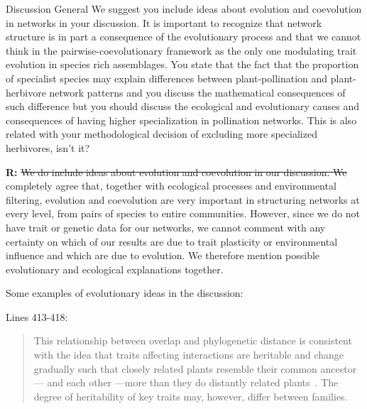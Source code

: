 \documentclass[12pt]{letter}
\newenvironment{refquote}{\bigskip \begin{it}}{\end{it}\smallskip}
\providecommand{\DIFadd}[1]{{\protect\color{blue}\uwave{#1}}} %
\providecommand{\DIFdel}[1]{{\protect\color{red}\sout{#1}}}                      %
\providecommand{\DIFaddbegin}{} %
\providecommand{\DIFaddend}{} %
\providecommand{\DIFdelbegin}{} %
\providecommand{\DIFdelend}{} %
\newcommand{\DIFscaledelfig}{0.5}
\newlength{\DIFdelgraphicswidth} %
\newlength{\DIFdelgraphicsheight} %
\newcommand{\DIFaddincludegraphics}[2][]{{\color{blue}\fbox{\DIFOincludegraphics[#1]{#2}}}} %
\newcommand{\DIFdelincludegraphics}[2][]{%
\sbox{\DIFdelgraphicsbox}{\DIFOincludegraphics[#1]{#2}}%
\settoboxwidth{\DIFdelgraphicswidth}{\DIFdelgraphicsbox} %
\settoboxtotalheight{\DIFdelgraphicsheight}{\DIFdelgraphicsbox} %
\scalebox{\DIFscaledelfig}{%
\parbox[b]{\DIFdelgraphicswidth}{\usebox{\DIFdelgraphicsbox}\\[-\baselineskip] \rule{\DIFdelgraphicswidth}{0em}}\llap{\resizebox{\DIFdelgraphicswidth}{\DIFdelgraphicsheight}{%
\setlength{\unitlength}{\DIFdelgraphicswidth}%
\begin{picture}(1,1)%
\thicklines\linethickness{2pt} %
{\color[rgb]{1,0,0}\put(0,0){\framebox(1,1){}}}%
{\color[rgb]{1,0,0}\put(0,0){\line( 1,1){1}}}%
{\color[rgb]{1,0,0}\put(0,1){\line(1,-1){1}}}%
\end{picture}%
}\hspace*{3pt}}} %
} %
\DeclareRobustCommand{\DIFaddbegin}{\DIFOaddbegin \let\includegraphics\DIFaddincludegraphics} %
\DeclareRobustCommand{\DIFaddend}{\DIFOaddend \let\includegraphics\DIFOincludegraphics} %
\DeclareRobustCommand{\DIFdelbegin}{\DIFOdelbegin \let\includegraphics\DIFdelincludegraphics} %
\DeclareRobustCommand{\DIFdelend}{\DIFOaddend \let\includegraphics\DIFOincludegraphics} %
\begin{document}
		\begin{refquote}
			Discussion
			General
			We suggest you include ideas about evolution and coevolution in networks in your discussion. It is important to recognize that network structure is in part a consequence of the evolutionary process and that we cannot think in the pairwise-coevolutionary framework as the only one modulating trait evolution in species rich assemblages.
			You state that the fact that the proportion of specialist species may explain differences between plant-pollination and plant-herbivore network patterns and you discuss the mathematical consequences of such difference but you should discuss the ecological and evolutionary causes and consequences of having higher specialization in pollination networks. This is also related with your methodological decision of excluding more specialized herbivores, isn't it?
		\end{refquote}


		\textbf{R:} \DIFdelbegin \DIFdel{We do include ideas about evolution and coevolution in our discussion. We }\DIFdelend %
		\DIFaddbegin \DIFadd{We }\DIFaddend completely agree that, together with ecological processes and environmental filtering, evolution and coevolution are very important in structuring networks at every level, from pairs of species to entire communities. However, since we do not have trait or genetic data for our networks, we cannot comment with any certainty on which of our results are due to trait plasticity or environmental influence and which are due to evolution. We therefore mention possible evolutionary and ecological explanations together.


		Some examples of evolutionary ideas in the discussion:


\DIFaddbegin 

		\DIFaddend Lines 413-418:

		\begin{quotation}

			This relationship between overlap and 
			phylogenetic distance is consistent with the idea that traits affecting 
			interactions are heritable and change gradually
			such that closely related plants resemble their common ancestor--- and
			each other ---more than they do distantly related 
			plants~\citep{Schemske1999,Gilbert2015,Ponisio2017}. The degree of 
			heritability of key traits may, however, differ between families.

		\end{quotation}
\end{document}
